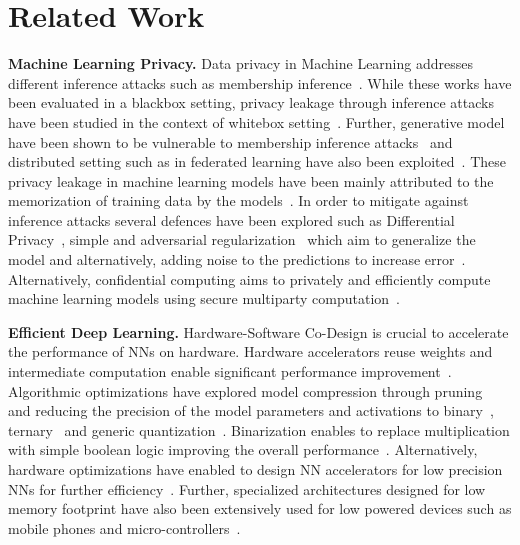 \section{Related Work}\label{related}


\noindent\textbf{Machine Learning Privacy.} Data privacy in Machine Learning addresses different inference attacks such as membership inference~\cite{salem2018ml,shokri2017membership}.
While these works have been evaluated in a blackbox setting, privacy leakage through inference attacks have been studied in the context of whitebox setting~\cite{DBLP:journals/corr/abs-1812-00910}.
Further, generative model have been shown to be vulnerable to membership inference attacks~\cite{LOGANMembershipInferenceAttacksAgainstGenerativeModels} and distributed setting such as in federated learning have also been exploited~\cite{melis2019exploiting,DBLP:journals/corr/abs-1812-00910}.
These privacy leakage in machine learning models have been mainly attributed to the memorization of training data by the models~\cite{236216,10.1145/3133956.3134077}.
In order to mitigate against inference attacks several defences have been explored such as Differential Privacy~\cite{Abadi:2016:DLD:2976749.2978318}, simple and adversarial regularization~\cite{DBLP:conf/ccs/NasrSH18,salem2018ml} which aim to generalize the model and alternatively, adding noise to the predictions to increase error~\cite{10.1145/3319535.3363201}.
Alternatively, confidential computing aims to privately and efficiently compute machine learning models using secure multiparty computation~\cite{235489}.


\noindent\textbf{Efficient Deep Learning.} Hardware-Software Co-Design is crucial to accelerate the performance of NNs on hardware.
Hardware accelerators reuse weights and intermediate computation enable significant performance improvement~\cite{10.1109/ISCA.2016.30}.
Algorithmic optimizations have explored model compression through pruning~\cite{Han:2015:LBW:2969239.2969366} and reducing the precision of the model parameters and activations to binary~\cite{NIPS2016_6573}, ternary~\cite{Li2016TernaryWN} and generic quantization~\cite{Hubara:2017:QNN:3122009.3242044}.
Binarization enables to replace multiplication with simple boolean logic improving the overall performance~\cite{rastegari2016xnornet}.
Alternatively, hardware optimizations have enabled to design NN accelerators for low precision NNs for further efficiency~\cite{Umuroglu2017FINNAF}.
Further, specialized architectures designed for low memory footprint have also been extensively used for low powered devices such as mobile phones and micro-controllers~\cite{DBLP:journals/corr/IandolaMAHDK16,conf/cvpr/SandlerHZZC18}. 
